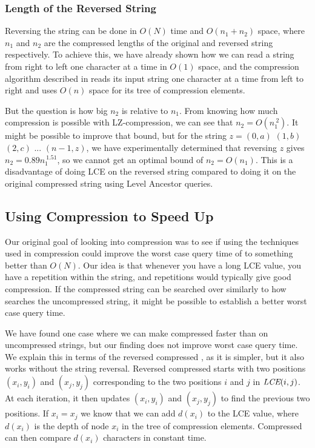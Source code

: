 \documentclass[a4]{article}
\newcommand*{\pref}{\prettyref}
\begin{document}
\subsubsection{Length of the Reversed String}

Reversing the string can be done in $O(N)$ time and $O(n_1 + n_2)$ space, where $n_1$ and $n_2$ are the compressed lengths of the original and reversed string respectively. To achieve this, we have already shown how we can read a string from right to left one character at a time in $O(1)$ space, and the compression algorithm described in \pref{sec:lz-definition} reads its input string one character at a time from left to right and uses $O(n)$ space for its tree of compression elements.

But the question is how big $n_2$ is relative to $n_1$. From knowing how much compression is possible with LZ-compression, we can see that $n_2=O(n_1^{~2})$. It might be possible to improve that bound, but for the string $z=(0,a)$ $(1,b)$ $(2,c)$ $...$ $(n-1,z)$, we have experimentally determined that reversing $z$ gives $n_2=0.89n_1^{~1.51}$, so we cannot get an optimal bound of $n_2=O(n_1)$. This is a disadvantage of doing LCE on the reversed string compared to doing it on the original compressed string using Level Ancestor queries.

\subsection{Using Compression to Speed Up }

Our original goal of looking into compression was to see if using the techniques used in compression could improve the worst case query time of  to something better than $O(N)$. Our idea is that whenever you have a long LCE value, you have a repetition within the string, and repetitions would typically give good compression. If the compressed string can be searched over similarly to how  searches the uncompressed string, it might be possible to establish a better worst case query time.

We have found one case where we can make compressed  faster than  on uncompressed strings, but our finding does not improve worst case query time. We explain this in terms of the reversed compressed , as it is simpler, but it also works without the string reversal. Reversed compressed  starts with two positions $(x_i,y_i)$ and $(x_j,y_j)$ corresponding to the two positions $i$ and $j$ in $\textit{LCE}(i,j)$. At each iteration, it then updates $(x_i,y_i)$ and $(x_j,y_j)$ to find the previous two positions. If $x_i = x_j$ we know that we can add $d(x_i)$ to the LCE value, where $d(x_i)$ is the depth of node $x_i$ in the tree of compression elements. Compressed  can then compare $d(x_i)$ characters in constant time.
\end{document}
